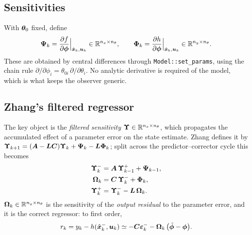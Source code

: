 \subsection{Sensitivities}
With $\bm{\theta}_0$ fixed, define
\begin{equation}
\bm{\Psi}_k = \frac{\partial f}{\partial\bm{\phi}}\Big|_{\hat{\bm{x}}_k,\bm{u}_k}\in\mathbb{R}^{n_x\times n_\theta} ,
\qquad
\bm{\Phi}_k = \frac{\partial h}{\partial\bm{\phi}}\Big|_{\hat{\bm{x}}_k,\bm{u}_k}\in\mathbb{R}^{n_y\times n_\theta} .
\label{eq:ad-sens}
\end{equation}
These are obtained by central differences through \texttt{Model::set\_params}, using the chain
rule $\partial/\partial\phi_i = \theta_{0i}\,\partial/\partial\theta_i$.  No analytic derivative
is required of the model, which is what keeps the observer generic.

\subsection{Zhang's filtered regressor}
The key object is the \emph{filtered sensitivity} $\bm{\Upsilon}\in\mathbb{R}^{n_x\times n_\theta}$,
which propagates the accumulated effect of a parameter error on the state estimate.  Zhang
\cite{zhang2002adaptiveobserver} defines it by
$\bm{\Upsilon}_{k+1} = (\bm{A}-\bm{L}\bm{C})\bm{\Upsilon}_k + \bm{\Psi}_k - \bm{L}\bm{\Phi}_k$; split across
the predictor--corrector cycle this becomes
\begin{align}
\bm{\Upsilon}^-_k &= \bm{A}\,\bm{\Upsilon}^+_{k-1} + \bm{\Psi}_{k-1} , \label{eq:ad-ups-pred}\\
\bm{\Omega}_k     &= \bm{C}\,\bm{\Upsilon}^-_k + \bm{\Phi}_k , \label{eq:ad-omega}\\
\bm{\Upsilon}^+_k &= \bm{\Upsilon}^-_k - \bm{L}\,\bm{\Omega}_k . \label{eq:ad-ups-upd}
\end{align}
$\bm{\Omega}_k\in\mathbb{R}^{n_y\times n_\theta}$ is the sensitivity of the \emph{output residual} to
the parameter error, and it is the correct regressor: to first order,
\begin{equation}
r_k = y_k - h(\hat{\bm{x}}^{-}_k,\bm{u}_k) \simeq -\bm{C}\bm{\varepsilon}^-_k - \bm{\Omega}_k\,\big(\hat{\bm{\phi}}-\bm{\phi}\big) .
\label{eq:ad-regress}
\end{equation}

